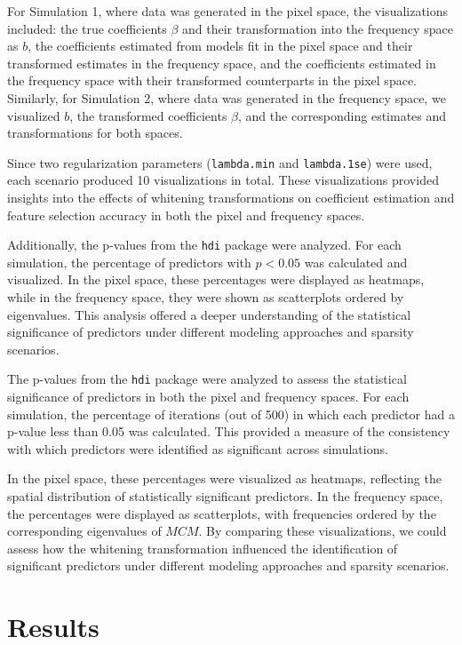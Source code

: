 \documentclass[12pt]{article}
\begin{document}
For Simulation 1, where data was generated in the pixel space, the visualizations included: the true coefficients \( \beta \) and their transformation into the frequency space as \( b \), the coefficients estimated from models fit in the pixel space and their transformed estimates in the frequency space, and the coefficients estimated in the frequency space with their transformed counterparts in the pixel space. Similarly, for Simulation 2, where data was generated in the frequency space, we visualized \( b \), the transformed coefficients \( \beta \), and the corresponding estimates and transformations for both spaces. 

Since two regularization parameters (\texttt{lambda.min} and \texttt{lambda.1se}) were used, each scenario produced 10 visualizations in total. These visualizations provided insights into the effects of whitening transformations on coefficient estimation and feature selection accuracy in both the pixel and frequency spaces.

Additionally, the p-values from the \texttt{hdi} package were analyzed. For each simulation, the percentage of predictors with \( p < 0.05 \) was calculated and visualized. In the pixel space, these percentages were displayed as heatmaps, while in the frequency space, they were shown as scatterplots ordered by eigenvalues. This analysis offered a deeper understanding of the statistical significance of predictors under different modeling approaches and sparsity scenarios.

The p-values from the \texttt{hdi} package were analyzed to assess the statistical significance of predictors in both the pixel and frequency spaces. For each simulation, the percentage of iterations (out of 500) in which each predictor had a p-value less than 0.05 was calculated. This provided a measure of the consistency with which predictors were identified as significant across simulations. 

In the pixel space, these percentages were visualized as heatmaps, reflecting the spatial distribution of statistically significant predictors. In the frequency space, the percentages were displayed as scatterplots, with frequencies ordered by the corresponding eigenvalues of \( MCM \). By comparing these visualizations, we could assess how the whitening transformation influenced the identification of significant predictors under different modeling approaches and sparsity scenarios.



\section{Results}
\end{document}
